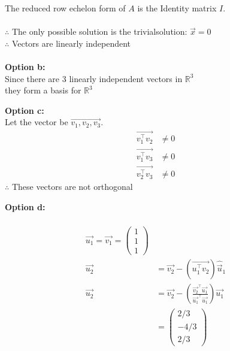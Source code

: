 \documentclass{beamer}
\begin{document}
\begin{frame}
The reduced row echelon form of $A$ is the Identity matrix $I$.\\\\
$\therefore$ The only possible solution is the trivialsolution:
$\vec{x}=0$\\
$\therefore$ Vectors are linearly independent\\\\
\textbf{Option b:}\\
Since there are 3 linearly independent vectors in $\mathbb{R}^3$ \\they form a basis for $\mathbb{R}^3$
\end{frame}
\begin{frame}
\textbf{Option c:}\\
    Let the vector be $\vec{v_1, v_2, v_3}$.
    \begin{align}
    \vec{v_1^\top v_2} &\neq 0 \\
    \vec{v_1^\top v_3 }&\neq 0 \\
    \vec{v_2^\top v_3 }&\neq 0
    \end{align}
    $\therefore$ These vectors are not orthogonal
\end{frame}
\begin{frame}
\textbf{Option d:}\\
 \\
\begin{align}\vec{u_1} = \vec{v_1} = \begin{pmatrix} 1 \\ 1\\1 \end{pmatrix}\\
\vec{u_2} &= \vec{v_2} - (\vec{u_1^\top v_2}) \hat{\vec{u}}_1 \\
\vec{u_2} &= \vec{v_2} - \left(\frac{\vec{v_2}^\top \vec{u_1}}{\vec{u_1}^\top \vec{u_1}} \right) \vec{u_1}\\ &= \begin{pmatrix} 2/3 \\ -4/3 \\ 2/3 \end{pmatrix} 
\end{align}
\end{frame}
\end{document}
